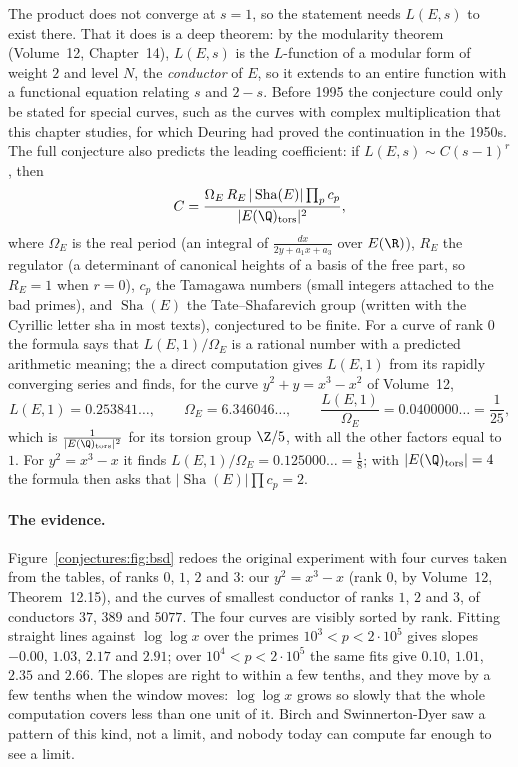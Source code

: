 The product does not converge at $s=1$, so the statement needs $L(E,s)$ to exist there. That it does is a deep theorem: by the modularity theorem
(Volume~12, Chapter~14), $L(E,s)$ is the $L$-function of a modular form of weight $2$ and level $N$, the \emph{conductor} of $E$, so it extends to an entire
function with a functional equation relating $s$ and $2-s$. Before 1995 the conjecture could only be stated for special curves, such as the curves with
complex multiplication that this chapter studies, for which Deuring had proved the continuation in the 1950s. The full conjecture also predicts the leading
coefficient: if $L(E,s)\sim C(s-1)^r$, then
\[
C=\frac{\Omega_E\,R_E\,|\operatorname{Sha}(E)|\prod_pc_p}{|E(\Q)_{\mathrm{tors}}|^2},
\]
where $\Omega_E$ is the real period (an integral of $\frac{dx}{2y+a_1x+a_3}$ over $E(\R)$), $R_E$ the regulator (a determinant of canonical heights of a basis
of the free part, so $R_E=1$ when $r=0$), $c_p$ the Tamagawa numbers (small integers attached to the bad primes), and $\operatorname{Sha}(E)$ the Tate--Shafarevich group (written with the Cyrillic letter sha in most texts),
conjectured to be finite. For a curve of rank $0$ the formula says that $L(E,1)/\Omega_E$ is a rational number with a predicted arithmetic meaning; the
a direct computation gives $L(E,1)$ from its rapidly converging series and finds, for the curve $y^2+y=x^3-x^2$ of Volume~12,
\[
L(E,1)=0.253841\ldots,\qquad\Omega_E=6.346046\ldots,\qquad\frac{L(E,1)}{\Omega_E}=0.0400000\ldots=\frac1{25},
\]
which is $\frac1{|E(\Q)_{\mathrm{tors}}|^2}$ for its torsion group $\Z/5$, with all the other factors equal to $1$. For $y^2=x^3-x$ it finds
$L(E,1)/\Omega_E=0.125000\ldots=\frac18$; with $|E(\Q)_{\mathrm{tors}}|=4$ the formula then asks that $|\operatorname{Sha}(E)|\prod c_p=2$.

\paragraph{The evidence.} Figure~\ref{conjectures:fig:bsd} redoes the original experiment with four curves taken from the tables, of ranks $0$, $1$, $2$ and $3$: our
$y^2=x^3-x$ (rank $0$, by Volume~12, Theorem~12.15), and the curves of smallest conductor of ranks $1$, $2$ and $3$, of conductors $37$, $389$ and $5077$. The
four curves are visibly sorted by rank. Fitting straight lines against $\log\log x$ over the primes $10^3<p<2\cdot10^5$ gives slopes $-0.00$, $1.03$,
$2.17$ and $2.91$; over $10^4<p<2\cdot10^5$ the same fits give $0.10$, $1.01$, $2.35$ and $2.66$. The slopes are right to within a few tenths, and they move
by a few tenths when the window moves: $\log\log x$ grows so slowly that the whole computation covers less than one unit of it. Birch and Swinnerton-Dyer
saw a pattern of this kind, not a limit, and nobody today can compute far enough to see a limit.


